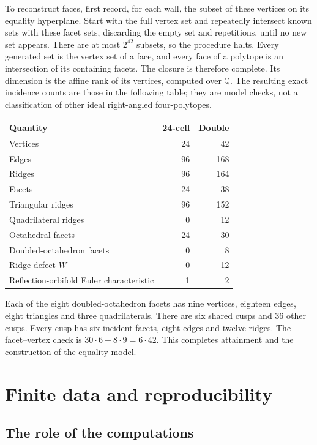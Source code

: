 \documentclass[11pt]{article}
\theoremstyle{remark}
\begin{document}
To reconstruct faces, first record, for each wall, the subset of these
vertices on its equality hyperplane. Start with the full vertex set
and repeatedly intersect known sets with these facet sets, discarding
the empty set and repetitions, until no new set appears. There are
at most $2^{42}$ subsets, so the procedure halts. Every generated set
is the vertex set of a face, and every face of a polytope is an
intersection of its containing facets. The closure is therefore
complete. Its dimension is the affine rank of its vertices, computed
over $\mathbb Q$. The resulting exact incidence counts are those
in the following table; they are model checks, not a classification
of other ideal right-angled four-polytopes.
\begin{center}
\begin{tabular}{lrr}
\toprule Quantity&24-cell&Double\\\midrule
Vertices&24&42\\ Edges&96&168\\ Ridges&96&164\\ Facets&24&38\\
Triangular ridges&96&152\\ Quadrilateral ridges&0&12\\
Octahedral facets&24&30\\ Doubled-octahedron facets&0&8\\
Ridge defect $W$&0&12\\ Reflection-orbifold Euler characteristic&1&2\\
\bottomrule
\end{tabular}
\end{center}
Each of the eight doubled-octahedron facets has nine vertices, eighteen
edges, eight triangles and three quadrilaterals. There are six shared
cusps and 36 other cusps. Every cusp has six incident facets, eight
edges and twelve ridges. The facet--vertex check is
$30\cdot6+8\cdot9=6\cdot42$. This completes attainment and
the construction of the equality model.

\appendix
\section{Finite data and reproducibility}\label{app:reproduction}

\subsection{The role of the computations}
\end{document}
